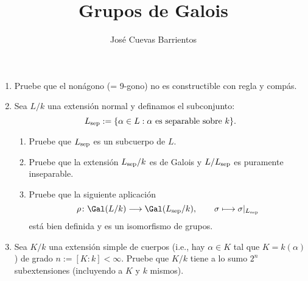 \documentclass[11pt, reqno]{amsart}
\title{Grupos de Galois}
\date{\DTMdate{2025-04-03}}
\author{José Cuevas Barrientos}
\begin{document}
\maketitle

\begin{enumerate}
	\item Pruebe que el nonágono (= 9-gono) no es constructible con regla y compás.

	\item Sea $L/k$ una extensión normal y definamos el subconjunto:
		\[
			L_{\rm sep} := \{ \alpha \in L : \alpha \text{ es separable sobre } k \}.
		\]
		\begin{enumerate}
			\item Pruebe que $L_{\rm sep}$ es un subcuerpo de $L$.
			\item Pruebe que la extensión $L_{\rm sep}/k$ es de Galois y $L/L_{\rm sep}$ es puramente inseparable.
			\item Pruebe que la siguiente aplicación
				\[
					\rho \colon \Gal(L/k) \longrightarrow \Gal(L_{\rm sep}/k), \qquad \sigma \longmapsto \sigma|_{L_{\rm sep}}
				\]
				está bien definida y es un isomorfismo de grupos.
		\end{enumerate}

	\item\label{exr:simple_subextension_count}
		Sea $K/k$ una extensión simple de cuerpos (i.e., hay $\alpha \in K$ tal que $K = k(\alpha)$) de grado $n
		:= [K:k] < \infty$.
		Pruebe que $K/k$ tiene a lo sumo $2^n$ subextensiones (incluyendo a $K$ y $k$ mismos).


\end{enumerate}
\end{document}

